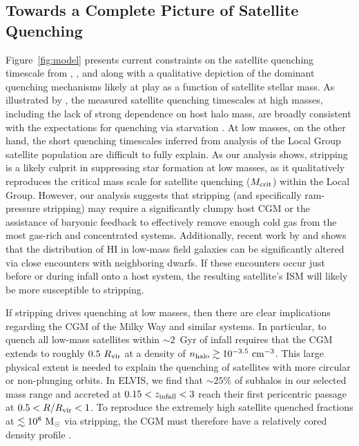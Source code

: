 


\subsection{Towards a Complete Picture of Satellite Quenching}
\label{subsec:BigPic}


Figure~\ref{fig:model} presents current constraints on the satellite
quenching timescale from \citet{wetzel13}, \citet{wheeler14}, and
\citet{fham15} along with a qualitative depiction of the dominant
quenching mechanisms likely at play as a function of satellite stellar
mass.
%
As illustrated by \citet{fham15}, the measured satellite quenching
timescales at high masses, including the lack of strong dependence on
host halo mass, are broadly consistent with the expectations for
quenching via starvation \citep[see also][]{vdb08, wetzel13}.
%
At low masses, on the other hand, the short quenching timescales
inferred from analysis of the Local Group satellite population are
difficult to fully explain.
%
As our analysis shows, stripping is a likely culprit in suppressing
star formation at low masses, as it qualitatively reproduces the
critical mass scale for satellite quenching ($M_{\rm crit}$) within
the Local Group.
%
However, our analysis suggests that stripping (and specifically
ram-pressure stripping) may require a significantly clumpy host CGM or
the assistance of baryonic feedback to effectively remove enough cold
gas from the most gas-rich and concentrated systems.
%
Additionally, recent work by \citet{pearson16} and \citet{marasco16}
shows that the distribution of H{\scriptsize I} in low-mass field
galaxies can be significantly altered via close encounters with
neighboring dwarfs. 
If these encounters occur just before or during infall onto a host
system, the resulting satellite's ISM will likely be more susceptible to
stripping. 
%

If stripping drives quenching at low masses, then there are clear
implications regarding the CGM of the Milky Way and similar systems. 
%
In particular, to quench all low-mass satellites within $\sim2$~Gyr of
infall requires that the CGM extends to roughly $0.5~R_{\rm vir}$
\citep[or $\sim150$~kpc,][]{fham15} at a density of $n_{\rm halo}
\gtrsim 10^{-3.5}~{\rm cm}^{-3}$.
%
This large physical extent is needed to explain the quenching of
satellites with more circular or non-plunging orbits.
In ELVIS, we find that $\sim 25\%$ of subhalos in our selected mass
range and accreted at $0.15 < z_{\rm infall} < 3$ reach their first
pericentric passage at $0.5 < R/R_{\rm vir} < 1$.
%
To reproduce the extremely high satellite quenched fractions at
$\lesssim10^{8}~{\rm M}_{\odot}$ via stripping, the CGM must therefore have a
relatively cored density profile \citep[e.g.][]{MB04}.



